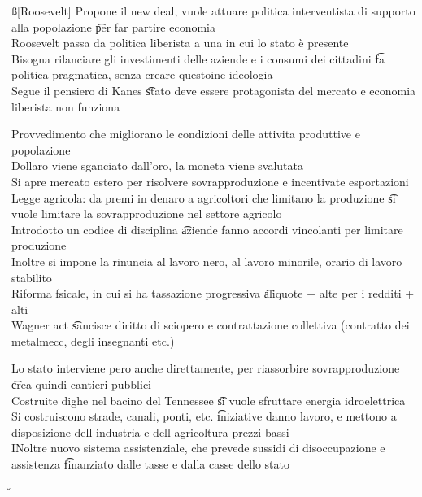 \documentclass[12pt]{article}
\begin{document}
\ss[Roosevelt]
Propone il new deal, vuole attuare politica interventista di supporto alla popolazione \t per far partire economia \\
Roosevelt passa da politica liberista a una in cui lo stato è presente \\
Bisogna rilanciare gli investimenti delle aziende e i consumi dei cittadini \t fa politica pragmatica, senza creare questoine ideologia \\
Segue il pensiero di Kanes \t stato deve essere protagonista del mercato e economia liberista non funziona

Provvedimento che migliorano le condizioni delle attivita produttive e popolazione \\
Dollaro viene sganciato dall'oro, la moneta viene svalutata \\
Si apre mercato estero per risolvere sovrapproduzione e incentivate esportazioni \\
Legge agricola: da premi in denaro a agricoltori che limitano la produzione \t si vuole limitare la sovrapproduzione nel settore agricolo \\
Introdotto un codice di disciplina \t aziende fanno accordi vincolanti per limitare produzione \\
Inoltre si impone la rinuncia al lavoro nero, al lavoro minorile, orario di lavoro stabilito \\
Riforma fsicale, in cui si ha tassazione progressiva \t aliquote + alte per i redditi + alti \\
Wagner act \t sancisce diritto di sciopero e contrattazione collettiva (contratto dei metalmecc, degli insegnanti etc.)

Lo stato interviene pero anche direttamente, per riassorbire sovrapproduzione \t crea quindi cantieri pubblici \\
Costruite dighe nel bacino del Tennessee \t si vuole sfruttare energia idroelettrica \\
Si costruiscono strade, canali, ponti, etc. \t iniziative danno lavoro, e mettono a disposizione dell industria e dell agricoltura prezzi bassi \\
INoltre nuovo sistema assistenziale, che prevede sussidi di disoccupazione e assistenza \t finanziato dalle tasse e dalla casse dello stato

\v
\end{document}
